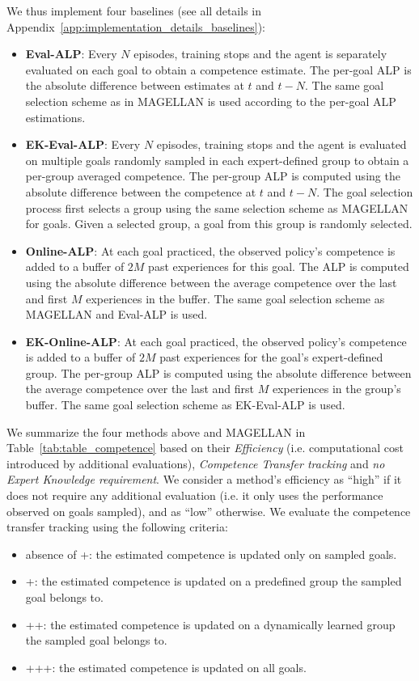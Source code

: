 \documentclass{article}
\begin{document}
We thus implement four baselines (see all details in Appendix~\ref{app:implementation_details_baselines}):
\begin{itemize}[noitemsep,topsep=0pt,parsep=0pt,partopsep=0pt]
    \item \textbf{Eval-ALP}: Every $N$ episodes, training stops and the agent is separately evaluated on each goal to obtain a competence estimate. The per-goal ALP is the absolute difference between estimates at $t$ and $t-N$. The same goal selection scheme as in MAGELLAN is used according to the per-goal ALP estimations.
    \item \textbf{EK-Eval-ALP}: Every $N$ episodes, training stops and the agent is evaluated on multiple goals randomly sampled in each expert-defined group to obtain a per-group averaged competence. The per-group ALP is computed using the absolute difference between the competence at $t$ and $t-N$. The goal selection process first selects a group using the same selection scheme as MAGELLAN for goals. Given a selected group, a goal from this group is randomly selected.
    \item \textbf{Online-ALP}: At each goal practiced, the observed policy's competence is added to a buffer of $2M$ past experiences for this goal. The ALP is computed using the absolute difference between the average competence over the last and first $M$ experiences in the buffer. The same goal selection scheme as MAGELLAN and Eval-ALP is used.
    \item \textbf{EK-Online-ALP}: At each goal practiced, the observed policy's competence is added to a buffer of $2M$ past experiences for the goal's expert-defined group. The per-group ALP is computed using the absolute difference between the average competence over the last and first $M$ experiences in the group's buffer. The same goal selection scheme as EK-Eval-ALP is used.
\end{itemize}

We summarize the four methods above and MAGELLAN in Table~\ref{tab:table_competence} based on their \textit{Efficiency} (i.e. computational cost introduced by additional evaluations), \textit{Competence Transfer tracking} and \textit{no Expert Knowledge requirement}. We consider a method’s efficiency as “high” if it does not require any additional evaluation (i.e. it only uses the performance observed on goals sampled), and as “low” otherwise. We evaluate the competence transfer tracking using the following criteria:
\begin{itemize}[noitemsep,topsep=0pt,parsep=0pt,partopsep=0pt]
    \item absence of +: the estimated competence is updated only on sampled goals.
    \item +: the estimated competence is updated on a predefined group the sampled goal belongs to.
    \item ++: the estimated competence is updated on a dynamically learned group the sampled goal belongs to.
    \item +++: the estimated competence is updated on all goals.
\end{itemize}
\end{document}
